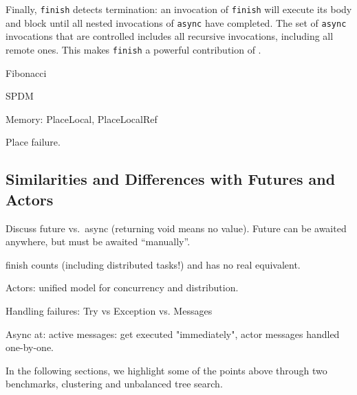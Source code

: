 Finally, \lstinline{finish} detects termination: an invocation of
\lstinline{finish} will execute its body and block until all nested invocations
of \lstinline{async} have completed. The set of \lstinline{async} invocations
that are controlled includes all recursive invocations, including all remote
ones. This makes \lstinline{finish} a powerful contribution of \apgas.

Fibonacci

SPDM

Memory: PlaceLocal, PlaceLocalRef

Place failure.

\subsection{Similarities and Differences with Futures and Actors}

Discuss future vs.\ async (returning void means no value). Future can be awaited anywhere, but must be awaited ``manually''.

finish counts (including distributed tasks!) and has no real equivalent.

Actors: unified model for concurrency and distribution.

Handling failures: Try vs Exception vs. Messages

Async at: active messages: get executed "immediately", actor messages handled one-by-one.

In the following sections, we highlight some of the points above through two
benchmarks, \kmeans clustering and unbalanced tree search.


% 
